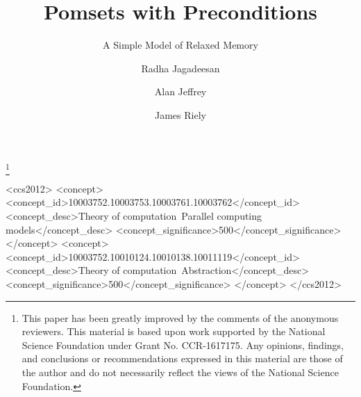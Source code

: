 \documentclass[acmsmall]{acmart}\settopmatter{printfolios=true}
\theoremstyle{acmdefinition}
\begin{document}
\title{Pomsets with Preconditions}
\subtitle{A Simple Model of Relaxed Memory}
\author{Radha Jagadeesan}

\author{Alan Jeffrey}

\author{James Riely}


\thanks{This paper has been greatly improved by the comments of the anonymous reviewers. 
This material is based upon work supported by the National Science Foundation
under Grant No. CCR-1617175. Any opinions, findings, and conclusions or
recommendations expressed in this material are those of the author and do not
necessarily reflect the views of the National Science Foundation.}
\begin{abstract}

\end{abstract}

\begin{CCSXML}
<ccs2012>
<concept>
<concept_id>10003752.10003753.10003761.10003762</concept_id>
<concept_desc>Theory of computation~Parallel computing models</concept_desc>
<concept_significance>500</concept_significance>
</concept>
<concept>
<concept_id>10003752.10010124.10010138.10011119</concept_id>
<concept_desc>Theory of computation~Abstraction</concept_desc>
<concept_significance>500</concept_significance>
</concept>
</ccs2012>
\end{CCSXML}
\end{document}
